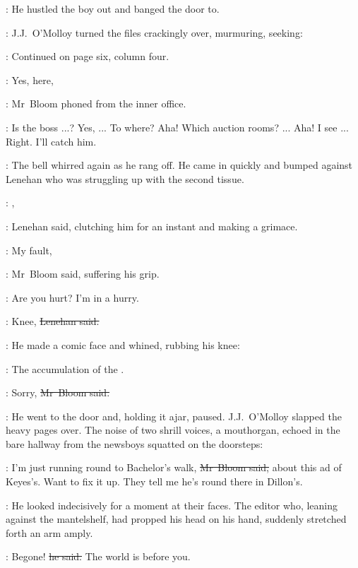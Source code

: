 :
He hustled the boy out and banged the door to.

:
J.J.~O'Molloy turned the files crackingly over,
murmuring,
seeking:

\jjom:
Continued on page six, column four.

\Bloom:
Yes,  here,

:
Mr~Bloom phoned from the inner office.

\Bloom:
Is the boss ...?
Yes,  ...
To where?
Aha!
Which auction rooms? ...
Aha!
I see ...
Right.
I'll catch him.



:
The bell whirred again as he rang off.
He came in quickly and bumped against Lenehan
who was struggling up with the second tissue.

\lenehan:
,

:
Lenehan said,
clutching him for an instant
and making a grimace.

\Bloom:
My fault,

:
Mr~Bloom said,
suffering his grip.

\Bloom:
Are you hurt?
I'm in a hurry.

\lenehan:
Knee,
\sout{Lenehan said.}

:
He made a comic face and whined,
rubbing his knee:

\lenehan:
The accumulation of the .

\Bloom:
Sorry,
\sout{Mr~Bloom said.}

:
He went to the door
and, holding it ajar,
paused.
J.J.~O'Molloy slapped the heavy pages over.
The noise of two shrill voices,
a mouthorgan,
echoed in the bare hallway
from the newsboys squatted on the doorsteps:




\Bloom:
I'm just running round to Bachelor's walk,
\sout{Mr~Bloom said,}
about this ad of Keyes's.
Want to fix it up.
They tell me he's round there in Dillon's.

:
He looked indecisively for a moment at their faces.
The editor
who, leaning against the mantelshelf,
had propped his head on his hand,
suddenly stretched forth an arm amply.

\crawford:
Begone!
\sout{he said.}
The world is before you.

